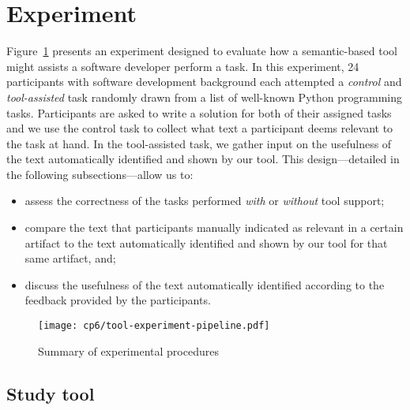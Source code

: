 




\section{Experiment}
\label{cp6:experiment}





Figure~\ref{fig:tool-experiment-procedures} presents an experiment designed to evaluate how a semantic-based tool might assists a software developer perform a task.
In this experiment, 24 participants with software development background each attempted a
\textit{control} and \textit{tool-assisted} task randomly drawn from a list of well-known Python programming tasks.
Participants are asked to write a solution for both of their assigned tasks
and we use the control task to collect what text a participant deems relevant to the task at hand.
In the tool-assisted task, we gather input on the usefulness of the text automatically identified and shown by our tool. 
This design---detailed in the following subsections---allow us to:




\begin{itemize}
    \item assess the correctness of the tasks performed \textit{with} or \textit{without} tool support;
    \item compare  the text that participants manually indicated as relevant in a certain artifact to the text automatically identified
    and shown by our tool for that same artifact, and;
    \item discuss the usefulness of the text automatically identified  according to the feedback provided by the participants.
\end{itemize}
 





\begin{figure}
\centering
\texttt{[image: cp6/tool-experiment-pipeline.pdf]}
\caption{Summary of experimental procedures}
\label{fig:tool-experiment-procedures}
\end{figure}






\subsection{Study tool}



